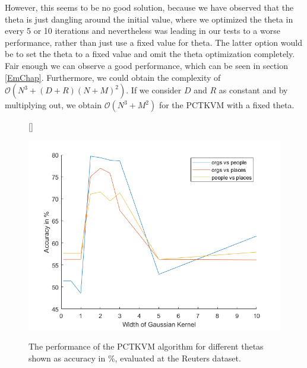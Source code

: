 However, this seems to be no good solution, because we have observed that the theta is just dangling around the initial value, where we optimized the theta in every 5 or 10 iterations and nevertheless was leading in our tests to a worse performance, rather than just use a fixed value for theta.
The latter option would be to set the theta to a fixed value and omit the theta optimization completely.
Fair enough we can observe a good performance, which can be seen in section \ref{EmChap}.
Furthermore, we could obtain the complexity of $\mathcal{O}(N^3+(D+R)(N+M)^2)$.
If we consider $D$ and $R$ as constant and by multiplying out, we obtain $\mathcal{O}(N^3+M^2)$ for the \acs{PCTKVM} with a fixed theta.
\begin{figure}
	\centering
	[\FBwidth]
	{\caption[Perfomance in Dependence of Theta]{The performance of the \acs{PCTKVM} algorithm for different thetas shown as accuracy in \%, evaluated at the Reuters dataset.}}
	{\includegraphics[width=\linewidth]{figures/PerformanceGaussianKernel.png}\label{FigPerfomanceTheta}}
\end{figure}
\FloatBarrier
